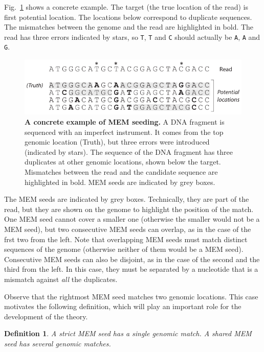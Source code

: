 \documentclass{article}
\newtheorem{definition}{Definition}
\begin{document}
Fig.~\ref{fig:MEM_example} shows a concrete example. The target (the true
location of the read) is first potential location. The locations below
correspond to duplicate sequences. The mismatches between the genome and
the read are highlighted in bold. The read has three errors indicated by
stars, so \texttt{T}, \texttt{T} and \texttt{C} should actually be
\texttt{A}, \texttt{A} and \texttt{G}.

\begin{figure}[h]
\centering
\includegraphics[scale=1]{MEM_example.pdf}
\caption{\textbf{A concrete example of MEM seeding.}
A DNA fragment is sequenced with an imperfect instrument. It comes from
the top genomic location (Truth), but three errors were introduced
(indicated by stars). The sequence of the DNA fragment has three
duplicates at other genomic locations, shown below the target. Mismatches
between the read and the candidate sequence are highlighted in bold. MEM
seeds are indicated by grey boxes.}
\label{fig:MEM_example}
\end{figure}

The MEM seeds are indicated by grey boxes. Technically, they are part of
the read, but they are shown on the genome to highlight the position of
the match. One MEM seed cannot cover a smaller one (otherwise the smaller
would not be a MEM seed), but two consecutive MEM seeds can overlap, as in
the case of the frst two from the left. Note that overlapping MEM seeds
must match distinct sequences of the genome (otherwise neither of them
would be a MEM seed). Consecutive MEM seeds can also be disjoint, as in
the case of the second and the third from the left. In this case, they
must be separated by a nucleotide that is a mismatch against \emph{all}
the duplicates.

Observe that the rightmost MEM seed matches two genomic locations. This
case motivates the following definition, which will play an important role
for the development of the theory.

\begin{definition}
A \emph{strict} MEM seed has a single genomic match.
A \emph{shared} MEM seed has several genomic matches.
\end{definition}
\end{document}
